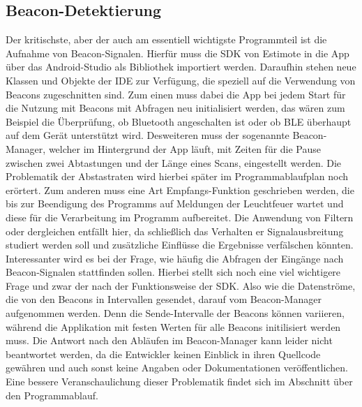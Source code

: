 \subsection{Beacon-Detektierung}
Der kritischste, aber der auch am essentiell wichtigste Programmteil ist die Aufnahme von Beacon-Signalen. Hierfür muss die SDK von Estimote in die App über das Android-Studio als Bibliothek importiert werden. Daraufhin stehen neue Klassen und Objekte der IDE zur Verfügung, die speziell auf die Verwendung von Beacons zugeschnitten sind. Zum einen muss dabei die App bei jedem Start für die Nutzung mit Beacons mit Abfragen neu initialisiert werden, das wären zum Beispiel die Überprüfung, ob Bluetooth angeschalten ist oder ob BLE überhaupt auf dem Gerät unterstützt wird. Desweiteren muss der sogenannte Beacon-Manager, welcher im Hintergrund der App läuft, mit Zeiten für die Pause zwischen zwei Abtastungen und der Länge eines Scans, eingestellt werden. Die Problematik der Abstastraten wird hierbei später im Programmablaufplan noch erörtert. Zum anderen muss eine Art Empfangs-Funktion geschrieben werden, die bis zur Beendigung des Programms auf Meldungen der Leuchtfeuer wartet und diese für die Verarbeitung im Programm aufbereitet. Die Anwendung von Filtern oder dergleichen entfällt hier, da schließlich das Verhalten er Signalausbreitung studiert werden soll und zusätzliche Einflüsse die Ergebnisse verfälschen könnten. Interessanter wird es bei der Frage, wie häufig die Abfragen der Eingänge nach Beacon-Signalen stattfinden sollen. Hierbei stellt sich noch eine viel wichtigere Frage und zwar der nach der Funktionsweise der SDK. Also wie die Datenströme, die von den Beacons in Intervallen gesendet, darauf vom Beacon-Manager aufgenommen werden. Denn die Sende-Intervalle der Beacons können variieren, während die Applikation mit festen Werten für alle Beacons initilisiert werden muss. Die Antwort nach den Abläufen im Beacon-Manager kann leider nicht beantwortet werden, da die Entwickler keinen Einblick in ihren Quellcode gewähren und auch sonst keine Angaben oder Dokumentationen veröffentlichen. Eine bessere Veranschaulichung dieser Problematik findet sich im Abschnitt über den Programmablauf.
